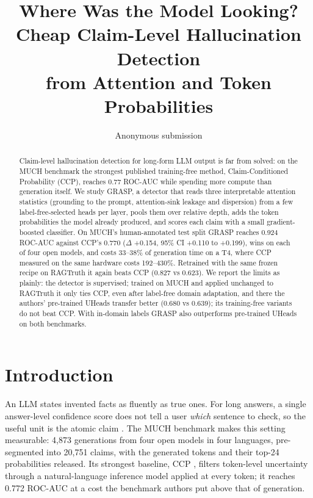\documentclass[11pt]{article}
\title{Where Was the Model Looking? Cheap Claim-Level Hallucination Detection\\ from Attention and Token Probabilities}
\author{Anonymous submission}
\date{}
\begin{document}
\maketitle

\begin{abstract}
Claim-level hallucination detection for long-form LLM output is far from solved: on the
MUCH benchmark the strongest published training-free method, Claim-Conditioned Probability
(CCP), reaches 0.77 ROC-AUC while spending more compute than generation itself. We study
GRASP, a detector that reads three interpretable attention statistics (grounding to the
prompt, attention-sink leakage and dispersion) from a few label-free-selected heads per layer,
pools them over relative depth, adds the token probabilities the model already produced, and
scores each claim with a small gradient-boosted classifier. On MUCH's human-annotated test
split GRASP reaches 0.924 ROC-AUC against CCP's 0.770 ($\Delta$ +0.154, 95\% CI
+0.110 to +0.199), wins on each of four open models, and costs 33--38\% of generation time
on a T4, where CCP measured on the same hardware costs 192--430\%. Retrained with the same
frozen recipe on RAGTruth it again beats CCP (0.827 vs 0.623). We report the limits as
plainly: the detector is supervised; trained on MUCH and applied unchanged to RAGTruth it only
ties CCP, even after label-free domain adaptation, and there the authors' pre-trained UHeads
transfer better (0.680 vs 0.639); its training-free variants do not beat CCP. With in-domain
labels GRASP also outperforms pre-trained UHeads on both benchmarks.
\end{abstract}

\section{Introduction}
An LLM states invented facts as fluently as true ones. For long answers, a single
answer-level confidence score does not tell a user \emph{which} sentence to check, so the useful
unit is the atomic claim \citep{min-etal-2023-factscore}. The MUCH benchmark
\citep{dentan2026muchmultilingualclaimhallucination} makes this setting measurable: 4,873
generations from four open models in four languages, pre-segmented into 20,751 claims, with the
generated tokens and their top-24 probabilities released. Its strongest baseline, CCP
\citep{fadeeva-etal-2024-fact}, filters token-level uncertainty through a natural-language
inference model applied at every token; it reaches 0.772 ROC-AUC at a cost the benchmark authors
put above that of generation.
\end{document}
